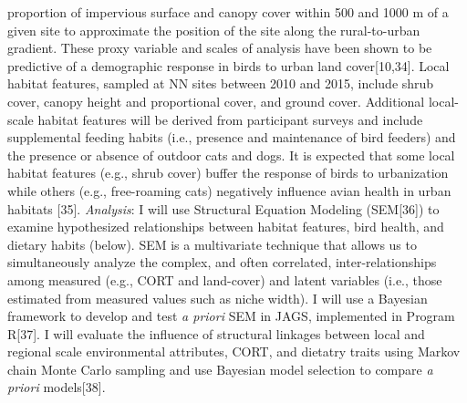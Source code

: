 \documentclass[12pt]{article}
\begin{document}
proportion of impervious surface and canopy cover within 500 and 1000 m of a given site to approximate the position of the site along the rural-to-urban gradient. These proxy variable and scales of analysis have been shown to be predictive of a demographic response in birds to urban land cover[10,34]. Local habitat features, sampled at NN sites between 2010 and 2015, include shrub cover, canopy height and proportional cover, and ground cover. Additional local-scale habitat features will be derived from participant surveys and include supplemental feeding habits (i.e., presence and maintenance of bird feeders) and the presence or absence of outdoor cats and dogs. It is expected that some local habitat features (e.g., shrub cover) buffer the response of birds to urbanization while others (e.g., free-roaming cats) negatively influence avian health in urban habitats [35]. \textit{Analysis}: I will use Structural Equation Modeling (SEM[36]) to examine hypothesized relationships between habitat features, bird health, and dietary habits (below). SEM is a multivariate technique that allows us to simultaneously analyze the complex, and often correlated, inter-relationships among measured (e.g., CORT and land-cover) and latent variables (i.e., those estimated from measured values such as niche width). I will use a Bayesian framework to develop and test \textit{a priori} SEM in JAGS, implemented in Program R[37]. I will evaluate the influence of structural linkages between local and regional scale environmental attributes, CORT, and dietatry traits using Markov chain Monte Carlo sampling and use Bayesian model selection to compare \textit{a priori} models[38]. 

\end{document}
